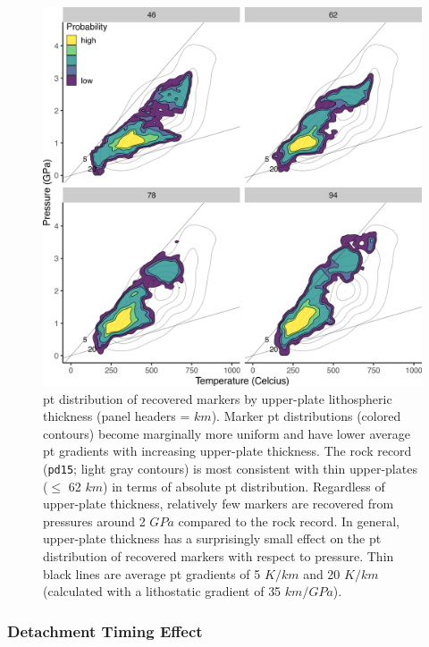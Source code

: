 \begin{figure}[htbp]

{\centering \includegraphics[width=1\linewidth,]{assets/figs/chpt4/zupDensity} 

}

\caption[Marker PT distribution by upper-plate thickness]{\gls{pt} distribution of recovered markers by upper-plate lithospheric thickness (panel headers = \(km\)). Marker \gls{pt} distributions (colored contours) become marginally more uniform and have lower average \gls{pt} gradients with increasing upper-plate thickness. The rock record (\texttt{pd15}; light gray contours) is most consistent with thin upper-plates (\(\leq\) 62 \(km\)) in terms of absolute \gls{pt} distribution. Regardless of upper-plate thickness, relatively few markers are recovered from pressures around 2 \(GPa\) compared to the rock record. In general, upper-plate thickness has a surprisingly small effect on the \gls{pt} distribution of recovered markers with respect to pressure. Thin black lines are average \gls{pt} gradients of 5 \(K/km\) and 20 \(K/km\) (calculated with a lithostatic gradient of 35 \(km/GPa\)).}\label{fig:zupDensity}
\end{figure}

\hypertarget{detachment-timing-effect}{%
\subsubsection{Detachment Timing Effect}\label{detachment-timing-effect}}

